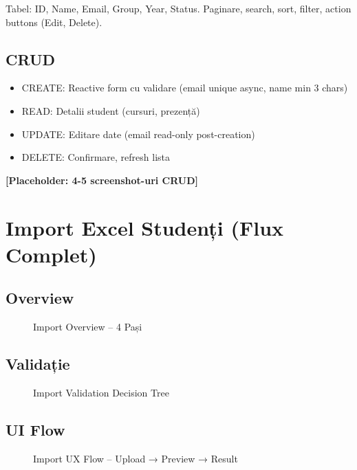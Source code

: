 Tabel: ID, Name, Email, Group, Year, Status. Paginare, search, sort, filter, action buttons (Edit, Delete).

\subsection{CRUD}

\begin{itemize}
  \item CREATE: Reactive form cu validare (email unique async, name min 3 chars)
  \item READ: Detalii student (cursuri, prezență)
  \item UPDATE: Editare date (email read-only post-creation)
  \item DELETE: Confirmare, refresh lista
\end{itemize}

\textbf{[Placeholder: 4-5 screenshot-uri CRUD]}

\section{Import Excel Studenți (Flux Complet)}

\subsection{Overview}

\begin{figure}[H]
  \centering
  \caption{Import Overview – 4 Pași}
  \label{fig:import-overview}
\end{figure}

\subsection{Validație}

\begin{figure}[H]
  \centering
  \caption{Import Validation Decision Tree}
  \label{fig:import-valid}
\end{figure}

\subsection{UI Flow}

\begin{figure}[H]
  \centering
  \caption{Import UX Flow – Upload → Preview → Result}
  \label{fig:import-ux}
\end{figure}

